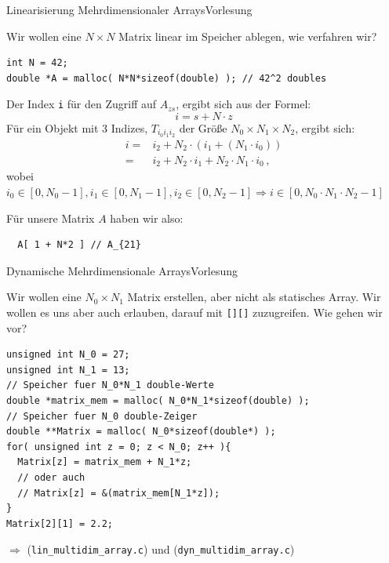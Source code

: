 \documentclass[xcolor=dvipsnames]{beamer}
\newcounter{lecturecounter}
\begin{document}
\begin{frame}[fragile]{Linearisierung Mehrdimensionaler Arrays}{Vorlesung }
\begin{block}{}
  Wir wollen eine $N \times N$ Matrix linear im Speicher ablegen, wie verfahren wir?
\end{block}
\begin{lstlisting}
int N = 42;
double *A = malloc( N*N*sizeof(double) ); // 42^2 doubles
\end{lstlisting}
Der Index \texttt{i} für den Zugriff auf $A_{zs}$, ergibt sich aus der Formel:
\begin{equation*}
  i = s + N \cdot z
\end{equation*}
Für ein Objekt mit $3$ Indizes, $T_{i_0 i_1 i_2}$ der Größe $N_0 \times N_1 \times N_2$, ergibt sich:
\begin{align*}
  i = & i_2 + N_2 \cdot ( i_1 + ( N_1 \cdot i_0 ) ) \\
    = & i_2 + N_2 \cdot i_1 + N_2 \cdot N_1 \cdot i_0 \, ,
\end{align*}
wobei $i_0 \in [ 0, N_0-1 ], i_1 \in [ 0, N_1-1 ], i_2 \in [ 0, N_2-1 ] \Rightarrow i \in [ 0, N_0 \cdot N_1 \cdot N_2 - 1 ]$
\begin{block}{}
  Für unsere Matrix $A$ haben wir also:
\end{block}
\begin{lstlisting}
  A[ 1 + N*2 ] // A_{21}
\end{lstlisting}
\end{frame}

\begin{frame}[fragile]{Dynamische Mehrdimensionale Arrays}{Vorlesung }
\begin{block}{}
  Wir wollen eine $N_0 \times N_1$ Matrix erstellen, aber nicht als statisches Array. Wir wollen es uns aber auch erlauben, darauf mit \texttt{[][]} zuzugreifen. Wie gehen wir vor?
\end{block}
\begin{lstlisting}
unsigned int N_0 = 27;
unsigned int N_1 = 13;
// Speicher fuer N_0*N_1 double-Werte
double *matrix_mem = malloc( N_0*N_1*sizeof(double) );
// Speicher fuer N_0 double-Zeiger
double **Matrix = malloc( N_0*sizeof(double*) );
for( unsigned int z = 0; z < N_0; z++ ){
  Matrix[z] = matrix_mem + N_1*z;
  // oder auch
  // Matrix[z] = &(matrix_mem[N_1*z]);
}
Matrix[2][1] = 2.2;
\end{lstlisting}
$\Rightarrow$ (\verb|lin_multidim_array.c|) und (\verb|dyn_multidim_array.c|)
\end{frame}
\end{document}
